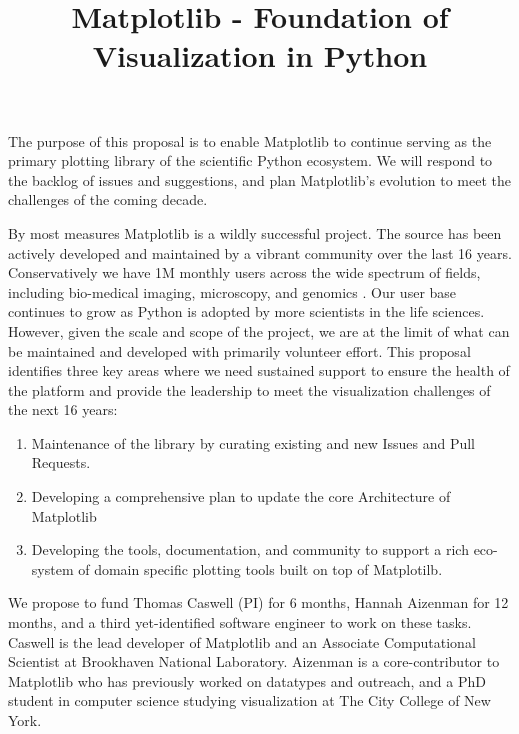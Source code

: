 \documentclass[11pt]{article}  %
\begin{document}
\title{​​Matplotlib - Foundation of Visualization in Python}
\author{}
\maketitle


The purpose of this proposal is to enable Matplotlib to continue
serving as the primary plotting library of the scientific Python
ecosystem.  We will respond to the backlog of issues and suggestions,
and plan Matplotlib's evolution to meet the challenges of the coming
decade.

By most measures Matplotlib is a wildly successful project.  The
source has been actively developed and maintained by a vibrant
community over the last 16 years.  Conservatively we have 1M monthly
users across the wide spectrum of fields, including bio-medical
imaging, microscopy, and genomics
\cite{Carpenter2006,Wolf2018,10.7717/peerj.453}
\cite{Segata2011,10.1371/journal.pgen.1000695,HASHIMSHONY2012666,
  10.1093/bioinformatics/bts480,Carlile2014,Laganowsky2014,Jiangaac9462,
  10.3389/fninf.2014.00014}.
Our user base continues to grow as Python is adopted by more
scientists in the life sciences.  However, given the scale and scope
of the project, we are at the limit of what can be maintained and
developed with primarily volunteer effort. This proposal identifies
three key areas where we need sustained support to ensure the health
of the platform and provide the leadership to meet the visualization
challenges of the next 16 years:

\begin{enumerate}[label=\alph*)]
  \item Maintenance of the library by curating existing and new Issues
    and Pull Requests.
  \item Developing a comprehensive plan to update the core Architecture
    of Matplotlib
  \item Developing the tools, documentation, and community to support
    a rich eco-system of domain specific plotting tools built on top
    of Matplotilb.
\end{enumerate}

We propose to fund Thomas Caswell (PI) for 6 months, Hannah Aizenman
for 12 months, and a third yet-identified software engineer to work on
these tasks.  Caswell is the lead developer of Matplotlib and an
Associate Computational Scientist at Brookhaven National Laboratory.
Aizenman is a core-contributor to Matplotlib who has previously worked
on datatypes and outreach, and a PhD student in computer science
studying visualization at The City College of New York.
\end{document}
